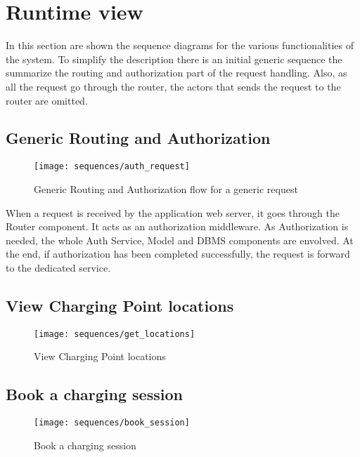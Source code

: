 \clearpage
\newpage

\section{Runtime view}
In this section are shown the sequence diagrams for the various functionalities of the system. To simplify the description there is an initial generic sequence the summarize the routing and authorization part of the request handling. Also, as all the request go through the router, the actors that sends the request to the router are omitted.

\subsection{Generic Routing and Authorization}
\begin{figure}[h]
\texttt{[image: sequences/auth\_request]}
\caption{Generic Routing and Authorization flow for a generic request}
\end{figure}

When a request is received by the application web server, it goes through the Router component. It acts as an authorization middleware. 
As Authorization is needed, the whole Auth Service, Model and DBMS components are envolved.
At the end, if authorization has been completed successfully, the request is forward to the dedicated service.


\subsection{View Charging Point locations}
\begin{figure}[h]
\texttt{[image: sequences/get\_locations]}
\caption{View Charging Point locations}
\end{figure}
\clearpage

\subsection{Book a charging session}
\begin{figure}[h]
\texttt{[image: sequences/book\_session]}
\caption{Book a charging session}
\end{figure}
\clearpage












